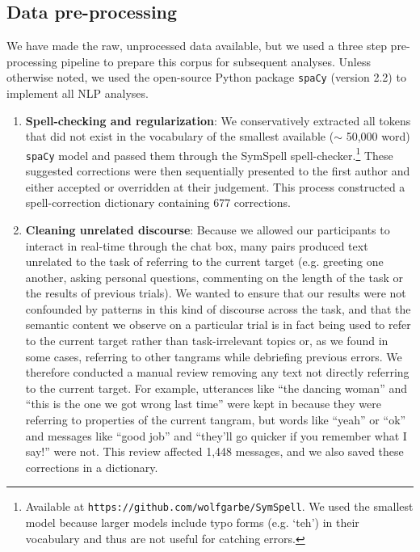 \documentclass[alpha-refs]{wiley-article}
\begin{document}
\subsection{Data pre-processing}

We have made the raw, unprocessed data available, but we used a three step pre-processing pipeline to prepare this corpus for subsequent analyses. Unless otherwise noted, we used the open-source Python package \texttt{spaCy} (version 2.2) to implement all NLP analyses.

\begin{enumerate}

\item \textbf{Spell-checking and regularization}: We conservatively extracted all tokens that did not exist in the vocabulary of the smallest available ($\sim$ 50,000 word) \texttt{spaCy} model and passed them through the SymSpell spell-checker.\footnote{Available at \texttt{https://github.com/wolfgarbe/SymSpell}. We used the smallest model because larger models include typo forms (e.g. `teh') in their vocabulary and thus are not useful for catching errors.} These suggested corrections were then sequentially presented to the first author and either accepted or overridden at their judgement. This process constructed a spell-correction dictionary containing 677 corrections.

\item \textbf{Cleaning unrelated discourse}: Because we allowed our participants to interact in real-time through the chat box, many pairs produced text unrelated to the task of referring to the current target (e.g. greeting one another, asking personal questions, commenting on the length of the task or the results of previous trials). We wanted to ensure that our results were not confounded by patterns in this kind of discourse across the task, and that the semantic content we observe on a particular trial is in fact being used to refer to the current target rather than task-irrelevant topics or, as we found in some cases, referring to other tangrams while debriefing previous errors. We therefore conducted a manual review removing any text not directly referring to the current target. For example, utterances like ``the dancing woman'' and ``this is the one we got wrong last time'' were kept in because they were referring to properties of the current tangram, but words like ``yeah'' or ``ok'' and messages like ``good job'' and ``they'll go quicker if you remember what I say!'' were not. This review affected 1,448 messages, and we also saved these corrections in a dictionary.


\end{enumerate}
\end{document}
